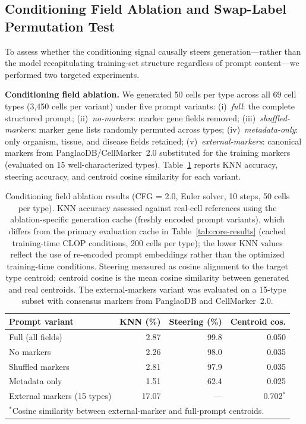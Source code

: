 \subsection{Conditioning Field Ablation and Swap-Label Permutation Test}\label{sec:cond-ablation}

To assess whether the conditioning signal causally steers generation---rather than the model recapitulating training-set structure regardless of prompt content---we performed two targeted experiments.

\textbf{Conditioning field ablation.} We generated 50 cells per type across all 69 cell types (3,450 cells per variant) under five prompt variants: (i)~\emph{full}: the complete structured prompt; (ii)~\emph{no-markers}: marker gene fields removed; (iii)~\emph{shuffled-markers}: marker gene lists randomly permuted across types; (iv)~\emph{metadata-only}: only organism, tissue, and disease fields retained; (v)~\emph{external-markers}: canonical markers from PanglaoDB/CellMarker~2.0 substituted for the training markers (evaluated on 15 well-characterized types). Table~\ref{tab:cond-ablation} reports KNN accuracy, steering accuracy, and centroid cosine similarity for each variant.

\begin{table}[!htbp]
\centering
\caption{Conditioning field ablation results (CFG = 2.0, Euler solver, 10 steps, 50 cells per type). KNN accuracy assessed against real-cell references using the ablation-specific generation cache (freshly encoded prompt variants), which differs from the primary evaluation cache in Table~\ref{tab:core-results} (cached training-time CLOP conditions, 200 cells per type); the lower KNN values reflect the use of re-encoded prompt embeddings rather than the optimized training-time conditions. Steering measured as cosine alignment to the target type centroid; centroid cosine is the mean cosine similarity between generated and real centroids. The external-markers variant was evaluated on a 15-type subset with consensus markers from PanglaoDB and CellMarker~2.0.\label{tab:cond-ablation}}
\begin{tabular}{lrrr}
\toprule
Prompt variant & KNN (\%) & Steering (\%) & Centroid cos. \\
\midrule
Full (all fields) & 2.87 & 99.8 & 0.050 \\
No markers & 2.26 & 98.0 & 0.035 \\
Shuffled markers & 2.81 & 97.9 & 0.035 \\
Metadata only & 1.51 & 62.4 & 0.025 \\
External markers (15 types) & 17.07 & --- & 0.702$^*$ \\
\bottomrule
\multicolumn{4}{l}{\footnotesize $^*$Cosine similarity between external-marker and full-prompt centroids.}
\end{tabular}
\end{table}

